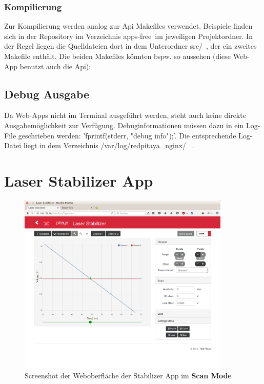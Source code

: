 \documentclass[11pt]{scrartcl}
\begin{document}
\subsubsection{Kompilierung}
Zur Kompilierung werden analog zur Api Makefiles verwendet. Beispiele finden sich in der Repository im Verzeichnis \grqq apps-free\grqq~im jeweiligen Projektordner. In der Regel liegen die Quelldateien dort in dem Unterordner \grqq src/\grqq~, der ein zweites Makefile enthält. Die beiden Makefiles könnten bspw. so aussehen (diese Web-App benutzt auch die Api):

   

   

\subsection{Debug Ausgabe}
Da Web-Apps nicht im Terminal ausgeführt werden, steht auch keine direkte Ausgabemöglichkeit zur Verfügung. Debuginformationen müssen dazu in ein Log-File geschrieben werden: 'fprintf(stderr, "debug info");'. Die entsprechende Log-Datei liegt in dem Verzeichnis \grqq /var/log/redpitaya\_nginx/ \grqq~.

\newpage
\section{Laser Stabilizer App}
\begin{figure}[ht]
	\centering
	\includegraphics[width=0.9\textwidth]{stabilizer.png}
	Screenshot der Weboberfläche der Stabilizer App im \textbf{Scan Mode}
\end{figure}
\end{document}
